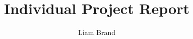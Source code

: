 \documentclass[a4paper,11pt,nocenter,bold,notitlepage,noheadline,noindent]{thesis}
\title{Individual Project Report}
\author{Liam Brand}
\begin{document}
	\maketitle
	\tableofcontents
	\listoffigures
	\listoftables
	
	
	
	\nocite{stachniss2013robotmappingintro}
	
	
	
\end{document}
